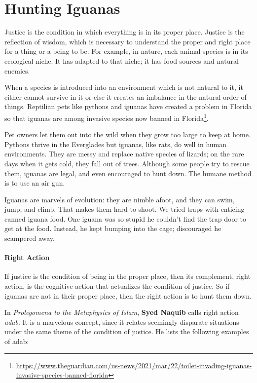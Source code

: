 \section{Hunting Iguanas}

Justice is the condition in which everything is in its proper place. Justice is the reflection of wisdom, which is necessary to understand the proper and right place for a thing or a being to be. For example, in nature, each animal species is in its ecological niche. It has adapted to that niche; it has food sources and natural enemies.

When a species is introduced into an environment which is not natural to it, it either cannot survive in it or else it creates an imbalance in the natural order of things. Reptilian pets like pythons and iguanas have created a problem in Florida so that iguanas are among invasive species now banned in Florida\footnote{\url{https://www.theguardian.com/us-news/2021/mar/22/toilet-invading-iguanas-invasive-species-banned-florida}}.

Pet owners let them out into the wild when they grow too large to keep at home. Pythons thrive in the Everglades but iguanas, like rats, do well in human environments. They are messy and replace native species of lizards; on the rare days when it gets cold, they fall out of trees. Although some people try to rescue them, iguanas are legal, and even encouraged to hunt down. The humane method is to use an air gun.

Iguanas are marvels of evolution: they are nimble afoot, and they can swim, jump, and climb. That makes them hard to shoot. We tried traps with enticing canned iguana food. One iguana was so stupid he couldn't find the trap door to get at the food. Instead, he kept bumping into the cage; discouraged he scampered away.

\paragraph{Right Action}


If justice is the condition of being in the proper place, then its complement, right action, is the cognitive action that actualizes the condition of justice. So if iguanas are not in their proper place, then the right action is to hunt them down.

In \emph{Prolegomena to the Metaphysics of Islam}, \textbf{Syed Naquib} calls right action \emph{adab}. It is a marvelous concept, since it relates seemingly disparate situations under the same theme of the condition of justice. He lists the following examples of adab:

